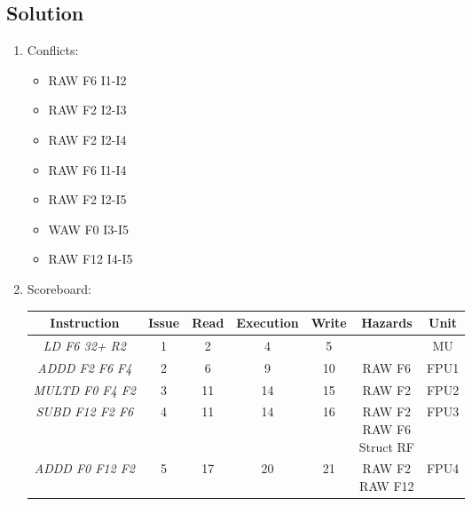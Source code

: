 \subsection*{Solution}
\begin{enumerate}
    \item Conflicts:
        \begin{itemize}
            \item RAW F6 I1-I2
            \item RAW F2 I2-I3
            \item RAW F2 I2-I4
            \item RAW F6 I1-I4
            \item RAW F2 I2-I5
            \item WAW F0 I3-I5
            \item RAW F12 I4-I5
        \end{itemize}
    \item Scoreboard:
        \begin{table}[H]
            \centering
            \begin{tabular}{c|cccc|cc}
            \textbf{Instruction}    & \textbf{Issue} & \textbf{Read} & \textbf{Execution} & \textbf{Write} & \textbf{Hazards}                         & \textbf{Unit} \\ \hline
            \textit{LD F6 32+ R2}   & 1              & 2             & 4                  & 5              &                                          & MU            \\
            \textit{ADDD F2 F6 F4}  & 2              & 6             & 9                  & 10             & RAW F6                                   & FPU1          \\
            \textit{MULTD F0 F4 F2} & 3              & 11            & 14                 & 15             & RAW F2                                   & FPU2          \\
            \textit{SUBD F12 F2 F6} & 4              & 11            & 14                 & 16             & \makecell{RAW F2 \\ RAW F6 \\ Struct RF} & FPU3          \\
            \textit{ADDD F0 F12 F2}          & 5              & 17            & 20                 & 21             & \makecell{RAW F2 \\ RAW F12}             & FPU4         
            \end{tabular}
        \end{table}
\end{enumerate}